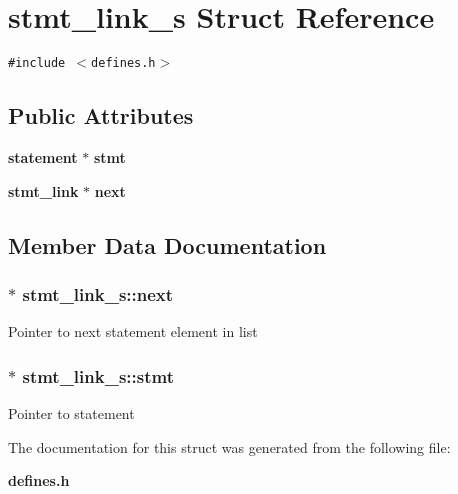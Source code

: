 \section{stmt\_\-link\_\-s  Struct Reference}
\label{structstmt__link__s}
{\tt \#include $<$defines.h$>$}

\subsection*{Public Attributes}
\begin{CompactItemize}
\item 
{\bf statement} $\ast$ {\bf stmt}
\item 
{\bf stmt\_\-link} $\ast$ {\bf next}
\end{CompactItemize}


\subsection{Member Data Documentation}
\subsubsection{$\ast$ stmt\_\-link\_\-s::next}\label{structstmt__link__s_m1}


Pointer to next statement element in list 
\subsubsection{$\ast$ stmt\_\-link\_\-s::stmt}\label{structstmt__link__s_m0}


Pointer to statement 

The documentation for this struct was generated from the following file:\begin{CompactItemize}
\item 
{\bf defines.h}\end{CompactItemize}
